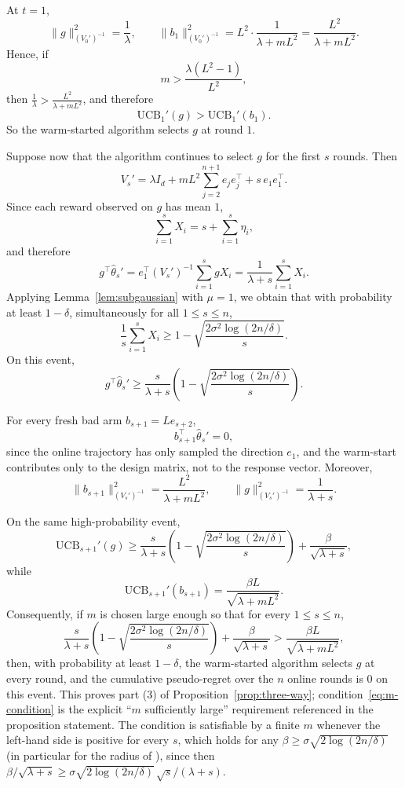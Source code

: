 \documentclass[anon]{alt2027} %
\providecommand{\qed}{\hfill\jmlrBlackBox}
\begin{document}
At $t=1$,
\[
\|g\|_{(V_0')^{-1}}^2=\frac{1}{\lambda},
\qquad
\|b_1\|_{(V_0')^{-1}}^2
=
L^2\cdot \frac{1}{\lambda+mL^2}
=
\frac{L^2}{\lambda+mL^2}.
\]
Hence, if
\[
m > \frac{\lambda(L^2-1)}{L^2},
\]
then $\frac{1}{\lambda}>\frac{L^2}{\lambda+mL^2}$, and therefore
\[
\mathrm{UCB}_1'(g)>\mathrm{UCB}_1'(b_1).
\]
So the warm-started algorithm selects $g$ at round $1$.

Suppose now that the algorithm continues to select $g$ for the first $s$ rounds. Then
\[
V_s'
=
\lambda I_d
+
mL^2 \sum_{j=2}^{n+1} e_j e_j^\top
+
s\, e_1 e_1^\top.
\]
Since each reward observed on $g$ has mean $1$,
\[
\sum_{i=1}^s X_i = s + \sum_{i=1}^s \eta_i,
\]
and therefore
\[
g^\top \hat{\theta}_s'
=
e_1^\top (V_s')^{-1}\sum_{i=1}^s g X_i
=
\frac{1}{\lambda+s}\sum_{i=1}^s X_i.
\]
Applying Lemma~\ref{lem:subgaussian} with $\mu=1$, we obtain that with probability at least $1-\delta$, simultaneously for all $1\le s\le n$,
\[
\frac{1}{s}\sum_{i=1}^s X_i
\ge
1-\sqrt{\frac{2\sigma^2\log(2n/\delta)}{s}}.
\]
On this event,
\[
g^\top \hat{\theta}_s'
\ge
\frac{s}{\lambda+s}
\left(
1-\sqrt{\frac{2\sigma^2\log(2n/\delta)}{s}}
\right).
\]

For every fresh bad arm $b_{s+1}=Le_{s+2}$,
\[
b_{s+1}^\top \hat{\theta}_s' = 0,
\]
since the online trajectory has only sampled the direction $e_1$, and the warm-start contributes only to the design matrix, not to the response vector. Moreover,
\[
\|b_{s+1}\|_{(V_s')^{-1}}^2
=
\frac{L^2}{\lambda+mL^2},
\qquad
\|g\|_{(V_s')^{-1}}^2
=
\frac{1}{\lambda+s}.
\]

On the same high-probability event,
\[
\mathrm{UCB}_{s+1}'(g)
\ge
\frac{s}{\lambda+s}
\left(
1-\sqrt{\frac{2\sigma^2\log(2n/\delta)}{s}}
\right)
+
\frac{\beta}{\sqrt{\lambda+s}},
\]
while
\[
\mathrm{UCB}_{s+1}'(b_{s+1})
=
\frac{\beta L}{\sqrt{\lambda+mL^2}}.
\]
Consequently, if $m$ is chosen large enough so that for every $1\le s\le n$,
\begin{equation}
\label{eq:m-condition}
\frac{s}{\lambda+s}
\left(
1-\sqrt{\frac{2\sigma^2\log(2n/\delta)}{s}}
\right)
+
\frac{\beta}{\sqrt{\lambda+s}}
>
\frac{\beta L}{\sqrt{\lambda+mL^2}},
\end{equation}
then, with probability at least $1-\delta$, the warm-started algorithm selects $g$ at every round, and the cumulative pseudo-regret over the $n$ online rounds is $0$ on this event. This proves part (3) of Proposition~\ref{prop:three-way}; condition~\eqref{eq:m-condition} is the explicit ``$m$ sufficiently large'' requirement referenced in the proposition statement. The condition is satisfiable by a finite $m$ whenever the left-hand side is positive for every $s$, which holds for any $\beta\ge\sigma\sqrt{2\log(2n/\delta)}$ (in particular for the radius of \citealp{abbasi2011improved}), since then $\beta/\sqrt{\lambda+s}\ge\sigma\sqrt{2\log(2n/\delta)}\,\sqrt s/(\lambda+s)$. \qed
\end{document}
